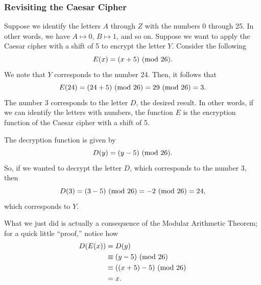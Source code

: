 \documentclass[letterpaper]{article}
\newcommand{\0}{\mathbf{0}}
\begin{document}
\subsubsection{Revisiting the Caesar Cipher}
Suppose we identify the letters $A$ through $Z$ with the numbers 0 through 25. In other words, we have $A \mapsto 0$, $B \mapsto 1$, and so on. Suppose we want to apply the Caesar cipher with a shift of 5 to encrypt the letter $Y$. Consider the following 
\[E(x) = (x + 5) \ (\mathrm{mod}\ 26).\]
We note that $Y$ corresponds to the number 24. Then, it follows that 
\[E(24) = (24 + 5) \ (\mathrm{mod}\ 26) = 29 \ (\mathrm{mod}\ 26) = 3.\]
The number 3 corresponds to the letter $D$, the desired result. In other words, if we can identify the letters with numbers, the function $E$ is the encryption function of the Caesar cipher with a shift of 5.  

\bigskip 

The decryption function is given by 
\[D(y) = (y - 5) \ (\mathrm{mod}\ 26).\]
So, if we wanted to decrypt the letter $D$, which corresponds to the number 3, then 
\[D(3) = (3 - 5) \ (\mathrm{mod}\ 26) = -2 \ (\mathrm{mod}\ 26) = 24,\]
which corresponds to $Y$. 

\bigskip 

What we just did is actually a consequence of the Modular Arithmetic Theorem; for a quick little ``proof,'' notice how  
\begin{equation*}
    \begin{aligned}
        D(E(x)) &= D(y) \\
            &\equiv (y - 5) \ (\mathrm{mod}\ 26) \\ 
            &\equiv ((x + 5) - 5) \ (\mathrm{mod}\ 26) \\ 
            &= x.
    \end{aligned} 
\end{equation*}
\end{document}
